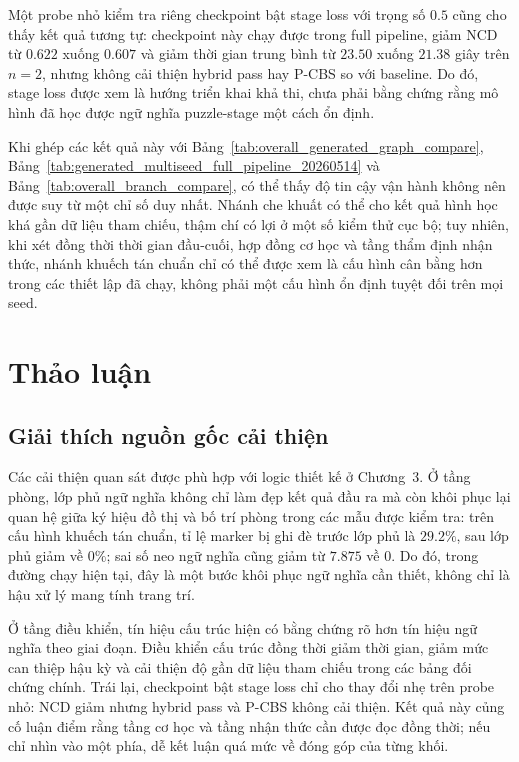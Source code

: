 \documentclass[oneside,a4paper,12pt]{extreport}
\begin{document}
Một probe nhỏ kiểm tra riêng checkpoint bật stage loss với trọng số $0.5$ cũng cho thấy kết quả tương tự: checkpoint này chạy được trong full pipeline, giảm NCD từ $0.622$ xuống $0.607$ và giảm thời gian trung bình từ $23.50$ xuống $21.38$ giây trên $n=2$, nhưng không cải thiện hybrid pass hay P-CBS so với baseline. Do đó, stage loss được xem là hướng triển khai khả thi, chưa phải bằng chứng rằng mô hình đã học được ngữ nghĩa puzzle-stage một cách ổn định.

Khi ghép các kết quả này với Bảng~\ref{tab:overall_generated_graph_compare}, Bảng~\ref{tab:generated_multiseed_full_pipeline_20260514} và Bảng~\ref{tab:overall_branch_compare}, có thể thấy độ tin cậy vận hành không nên được suy từ một chỉ số duy nhất. Nhánh che khuất có thể cho kết quả hình học khá gần dữ liệu tham chiếu, thậm chí có lợi ở một số kiểm thử cục bộ; tuy nhiên, khi xét đồng thời thời gian đầu-cuối, hợp đồng cơ học và tầng thẩm định nhận thức, nhánh khuếch tán chuẩn chỉ có thể được xem là cấu hình cân bằng hơn trong các thiết lập đã chạy, không phải một cấu hình ổn định tuyệt đối trên mọi seed.

\section{Thảo luận}
\subsection{Giải thích nguồn gốc cải thiện}
Các cải thiện quan sát được phù hợp với logic thiết kế ở Chương~3. Ở tầng phòng, lớp phủ ngữ nghĩa không chỉ làm đẹp kết quả đầu ra mà còn khôi phục lại quan hệ giữa ký hiệu đồ thị và bố trí phòng trong các mẫu được kiểm tra: trên cấu hình khuếch tán chuẩn, tỉ lệ marker bị ghi đè trước lớp phủ là $29.2\%$, sau lớp phủ giảm về $0\%$; sai số neo ngữ nghĩa cũng giảm từ $7.875$ về $0$. Do đó, trong đường chạy hiện tại, đây là một bước khôi phục ngữ nghĩa cần thiết, không chỉ là hậu xử lý mang tính trang trí.

Ở tầng điều khiển, tín hiệu cấu trúc hiện có bằng chứng rõ hơn tín hiệu ngữ nghĩa theo giai đoạn. Điều khiển cấu trúc đồng thời giảm thời gian, giảm mức can thiệp hậu kỳ và cải thiện độ gần dữ liệu tham chiếu trong các bảng đối chứng chính. Trái lại, checkpoint bật stage loss chỉ cho thay đổi nhẹ trên probe nhỏ: NCD giảm nhưng hybrid pass và P-CBS không cải thiện. Kết quả này củng cố luận điểm rằng tầng cơ học và tầng nhận thức cần được đọc đồng thời; nếu chỉ nhìn vào một phía, dễ kết luận quá mức về đóng góp của từng khối.
\end{document}
